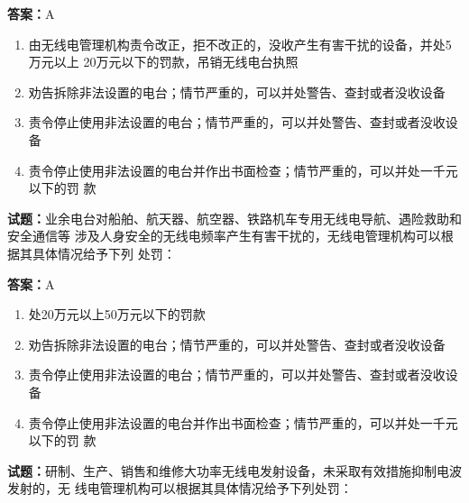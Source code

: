 \documentclass{ctexbook}
\begin{document}
\textbf{答案：}A 

\begin{enumerate}[leftmargin=3em]
  \item 由无线电管理机构责令改正，拒不改正的，没收产生有害干扰的设备，并处5万元以上
20万元以下的罚款，吊销无线电台执照 

  \item 劝告拆除非法设置的电台；情节严重的，可以并处警告、查封或者没收设备 

  \item 责令停止使用非法设置的电台；情节严重的，可以并处警告、查封或者没收设备 

  \item 责令停止使用非法设置的电台并作出书面检查；情节严重的，可以并处一千元以下的罚
款 

\end{enumerate}





\vspace{1em}

\textbf{试题：}业余电台对船舶、航天器、航空器、铁路机车专用无线电导航、遇险救助和安全通信等
涉及人身安全的无线电频率产生有害干扰的，无线电管理机构可以根据其具体情况给予下列
处罚： 

\textbf{答案：}A 

\begin{enumerate}[leftmargin=3em]
  \item 处20万元以上50万元以下的罚款 

  \item 劝告拆除非法设置的电台；情节严重的，可以并处警告、查封或者没收设备 

  \item 责令停止使用非法设置的电台；情节严重的，可以并处警告、查封或者没收设备 

  \item 责令停止使用非法设置的电台并作出书面检查；情节严重的，可以并处一千元以下的罚
款 

\end{enumerate}






\vspace{1em}

\textbf{试题：}研制、生产、销售和维修大功率无线电发射设备，未采取有效措施抑制电波发射的，无
线电管理机构可以根据其具体情况给予下列处罚： 
\end{document}
